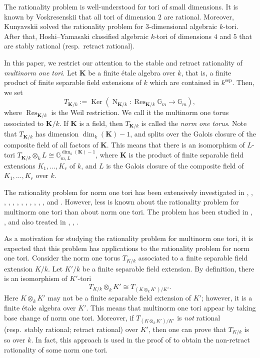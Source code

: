 \documentclass[12pt]{amsart}
\theoremstyle{plain}
\theoremstyle{definition}
\numberwithin{thm}{section}
\numberwithin{equation}{section}
\newcommand{\G}{\mathbb{G}}
\newcommand{\bK}{\mathbf{K}}
\DeclareMathOperator{\Ker}{Ker}
\DeclareMathOperator{\N}{N}
\DeclareMathOperator{\Res}{Res}
\DeclareMathOperator{\sep}{sep}
\begin{document}
The rationality problem is well-understood for tori of small dimensions. 
It is known by Voskresenskii \cite{Voskresenskii1967} that all tori of dimension $2$ are rational. Moreover, Kunyavskii \cite{Kunyavskii1990} solved the rationality problem for $3$-dimensional algebraic $k$-tori. 
After that, Hoshi--Yamasaki \cite{Hoshi2017} classified algebraic $k$-tori of dimensions $4$ and $5$ that are stably rational (resp.~retract rational). 

In this paper, we restrict our attention to the stable and retract rationality of \emph{multinorm one tori}. 
Let $\bK$ be a finite {\'e}tale algebra over $k$, that is, a finite product of finite separable field extensions of $k$ which are contained in $k^{\sep}$. Then, we set
\begin{equation*}
    T_{\bK/k}:=\Ker(\N_{\bK/k}\colon \Res_{\bK/k}\G_{m}\rightarrow \G_{m}),
\end{equation*}
where $\Res_{\bK/k}$ is the Weil restriction. 
We call it the multinorm one torus associated to $\bK/k$. If $\bK$ is a field, then $T_{\bK/k}$ is called the \emph{norm one torus}. Note that $T_{\bK/k}$ has dimension $\dim_{k}(\bK)-1$, and splits over the Galois closure of the composite field of all factors of $\bK$. This means that there is an isomorphism of $L$-tori $T_{\bK/k}\otimes_{k}L\cong \G_{m,L}^{\dim_{k}(\bK)-1}$, where $\bK$ is the product of finite separable field extensions $K_{1},\ldots,K_{r}$ of $k$, and $L$ is the Galois closure of the composite field of $K_{1},\ldots,K_{r}$ over $k$. 

The rationality problem for norm one tori has been extensively investigated in \cite{Endo1975}, \cite{ColliotThelene1977}, \cite{Hurlimann1984}, \cite{ColliotThelene1987}, \cite{LeBruyn95}, \cite{CortellaKunyavskii2000}, \cite{LemireLorenz2000}, \cite{Florence}, \cite{Endo2011},
\cite{Hoshi2017}, \cite{Hasegawa2020}, \cite{Hoshi2021}, 
\cite{Hoshi2024} and \cite{Hoshi}.
However, less is known about the rationality problem for multinorm one tori than about norm one tori. 
The problem has been studied in \cite{Hurlimann1984}, \cite{Endo2001}, and also treated in \cite{ColliotThelene1977}, \cite{CortellaKunyavskii2000}, \cite{Endo2011}.

As a motivation for studying the rationality problem for multinorm one tori, 
it is expected that this problem has applications to the rationality problem for norm one tori.
Consider the norm one torus $T_{K/k}$ associated to a finite separable field extension $K/k$. 
Let $K'/k$ be a finite separable field extension. 
By definition, there is an isomorphism of $K'$-tori
\begin{equation*}
T_{K/k}\otimes_{k}K'\cong T_{(K\otimes_{k}K')/K'}. 
\end{equation*}
Here $K\otimes_{k}K'$ may not be a finite separable field extension of $K'$; however, it is a finite {\'e}tale algebra over $K'$. 
This means that multinorm one tori appear by taking base change of norm one tori. 
Moreover, if $T_{(K\otimes_{k}K')/K'}$ is \emph{not} rational (resp.~stably rational; retract rational) over $K'$, then one can prove that $T_{K/k}$ is so over $k$. In fact, this approach is used in the proof of \cite[{$\lbrack$I$\rbrack$}]{Endo2011} to obtain the non-retract rationality of some norm one tori. 
\end{document}

